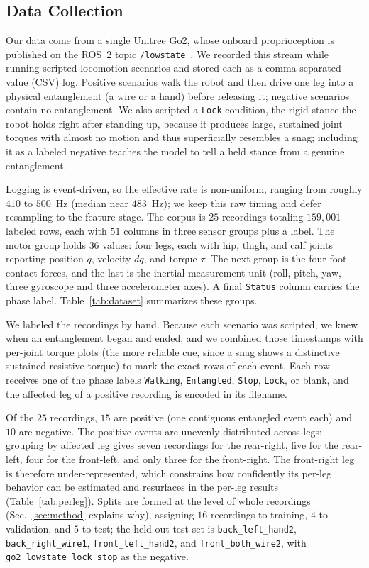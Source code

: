 \subsection{Data Collection}

Our data come from a single Unitree Go2, whose onboard proprioception is published on the ROS~2 topic \texttt{/lowstate}~\cite{macenski2022ros2,unitree_go2}. We recorded this stream while running scripted locomotion scenarios and stored each as a comma-separated-value (CSV) log. Positive scenarios walk the robot and then drive one leg into a physical entanglement (a wire or a hand) before releasing it; negative scenarios contain no entanglement. We also scripted a \texttt{Lock} condition, the rigid stance the robot holds right after standing up, because it produces large, sustained joint torques with almost no motion and thus superficially resembles a snag; including it as a labeled negative teaches the model to tell a held stance from a genuine entanglement.

Logging is event-driven, so the effective rate is non-uniform, ranging from roughly $410$ to $500$~Hz (median near $483$~Hz); we keep this raw timing and defer resampling to the feature stage. The corpus is $25$ recordings totaling $159{,}001$ labeled rows, each with $51$ columns in three sensor groups plus a label. The motor group holds $36$ values: four legs, each with hip, thigh, and calf joints reporting position $q$, velocity $dq$, and torque $\tau$. The next group is the four foot-contact forces, and the last is the inertial measurement unit (roll, pitch, yaw, three gyroscope and three accelerometer axes). A final \texttt{Status} column carries the phase label. Table~\ref{tab:dataset} summarizes these groups.

We labeled the recordings by hand. Because each scenario was scripted, we knew when an entanglement began and ended, and we combined those timestamps with per-joint torque plots (the more reliable cue, since a snag shows a distinctive sustained resistive torque) to mark the exact rows of each event. Each row receives one of the phase labels \texttt{Walking}, \texttt{Entangled}, \texttt{Stop}, \texttt{Lock}, or blank, and the affected leg of a positive recording is encoded in its filename.

Of the $25$ recordings, $15$ are positive (one contiguous entangled event each) and $10$ are negative. The positive events are unevenly distributed across legs: grouping by affected leg gives seven recordings for the rear-right, five for the rear-left, four for the front-left, and only three for the front-right. The front-right leg is therefore under-represented, which constrains how confidently its per-leg behavior can be estimated and resurfaces in the per-leg results (Table~\ref{tab:perleg}). Splits are formed at the level of whole recordings (Sec.~\ref{sec:method} explains why), assigning $16$ recordings to training, $4$ to validation, and $5$ to test; the held-out test set is \texttt{back\_left\_hand2}, \texttt{back\_right\_wire1}, \texttt{front\_left\_hand2}, and \texttt{front\_both\_wire2}, with \texttt{go2\_lowstate\_lock\_stop} as the negative.
